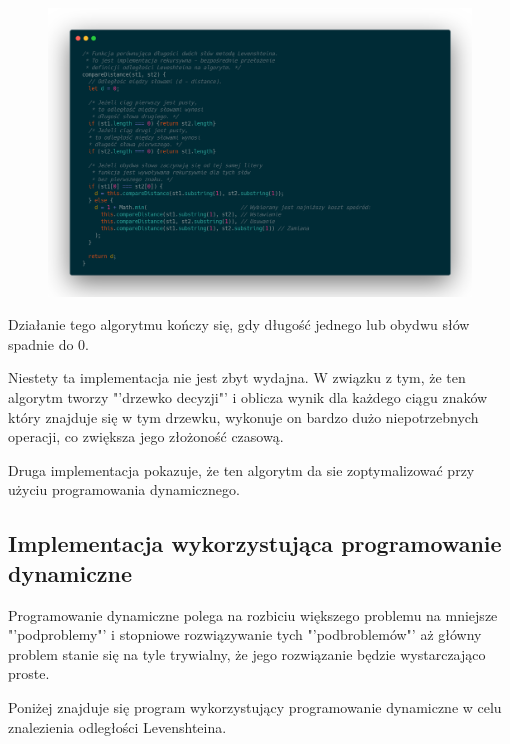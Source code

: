\documentclass[a4paper,12pt]{article}
\begin{document}
\begin{figure}[h]
    \includegraphics[width=\textwidth]{recursive.png}
\end{figure}

Działanie tego algorytmu kończy się, gdy długość
jednego lub obydwu słów spadnie do 0. \cite{jlordiales::edit}

Niestety ta implementacja nie jest zbyt wydajna.
W związku z tym, że ten algorytm tworzy "'drzewko decyzji"' i
oblicza wynik dla każdego ciągu znaków który znajduje się w
tym drzewku, wykonuje on bardzo dużo niepotrzebnych operacji, co
zwiększa jego złożoność czasową.

Druga implementacja pokazuje, że ten algorytm da sie zoptymalizować
przy użyciu programowania dynamicznego.

\subsection{Implementacja wykorzystująca programowanie dynamiczne}
Programowanie dynamiczne polega na rozbiciu
większego problemu na mniejsze "'podproblemy"' i
stopniowe rozwiązywanie tych "'podbroblemów"'
aż główny problem stanie się na tyle trywialny, że jego rozwiązanie
będzie wystarczająco proste.

Poniżej znajduje się program wykorzystujący programowanie
dynamiczne w celu znalezienia odległości Levenshteina.
\end{document}
